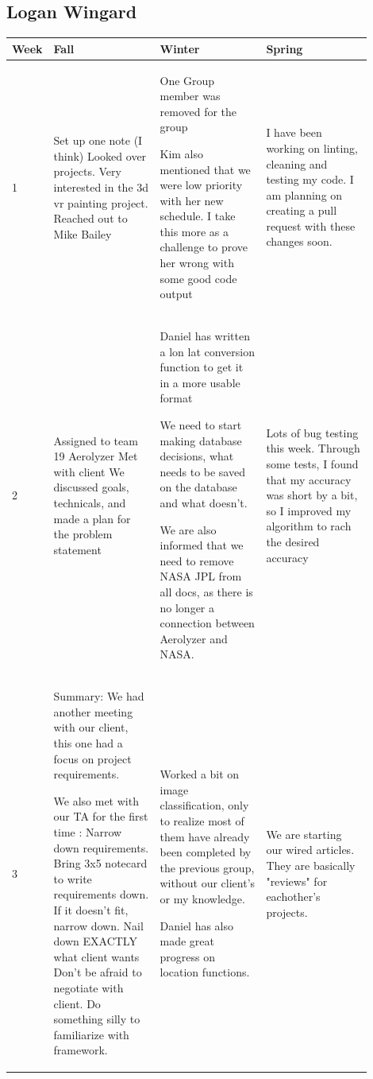 \documentclass[onecolumn, draftclsnofoot,10pt, compsoc]{IEEEtran}
\begin{document}
\begin{singlespace}
\begin{longtable}{|l|p{0.3\linewidth}|p{0.3\linewidth}|p{0.3\linewidth}|}
			\end{longtable}
		\subsection{Logan Wingard}
			\begin{longtable}{|l|p{0.3\linewidth}|p{0.3\linewidth}|p{0.3\linewidth}|}\hline \textbf{Week} & \textbf{Fall} & \textbf{Winter} & \textbf{Spring}\\\hline
			1 &
			Set up one note (I think) 
			Looked over projects. Very interested in the 3d vr painting project.
			Reached out to Mike Bailey & One Group member was removed for the group

Kim also mentioned that we were low priority with her new schedule. 
I take this more as a challenge to prove her wrong with some good code output & I have been working on linting, cleaning and testing my code.
I am planning on creating a pull request with these changes soon.
			\\\hline
			2 & 
			Assigned to team 19 Aerolyzer
			Met with client 
			We discussed goals, technicals, and made a plan for the problem statement  & Daniel has written a lon lat conversion function to get it in a more usable format

We need to start making database decisions, what needs to be saved on the database and what doesn't.

We are also informed that we need to remove NASA JPL from all docs, as there is no longer a connection between Aerolyzer and NASA. & Lots of bug testing this week. Through some tests, I found that my accuracy was short by a bit, so I improved my algorithm to rach the desired accuracy
			\\\hline
			3 & 
			Summary: 
			We had another meeting with our client, this one had a focus on project requirements.

			We also met with our TA for the first time :
			Narrow down requirements.
			Bring 3x5 notecard to write requirements down. If it doesn’t fit, narrow down.
			Nail down EXACTLY what client wants
			Don’t be afraid to negotiate with client. 
			Do something silly to familiarize with framework. & Worked a bit on image classification, only to realize most of them have already been completed by the previous group, without our client's or my knowledge.

Daniel has also made great progress on location functions. & We are starting our wired articles. They are basically "reviews" for eachother's projects.


\end{longtable}
\end{singlespace}
\end{document}
